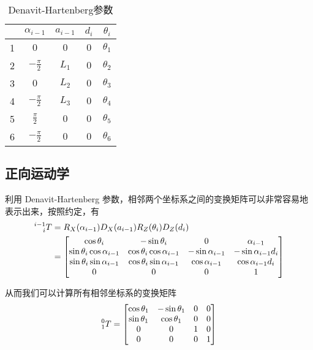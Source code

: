 \documentclass{ctexart}
\begin{document}
\begin{table}[ht]
    \caption{Denavit-Hartenberg参数}
    \label{tab:DH-params}
    \centering
    \begin{tabular}{c|cccc}
        \hline
        & $\alpha_{i-1}$ & $a_{i-1}$ & $d_i$ & $\theta_i$ \\
        \hline
        1 & $0$ & $0$ & $0$ & $\theta_1$ \\
        2 & $-\frac{\pi}{2}$ & $L_1$ & $0$ & $\theta_2$ \\
        3 & $0$ & $L_2$ & $0$ & $\theta_3$ \\
        4 & $-\frac{\pi}{2}$ & $L_3$ & $0$ & $\theta_4$\\
        5 & $\frac{\pi}{2}$ & $0$ & $0$ & $\theta_5$\\
        6 & $-\frac{\pi}{2}$ & $0$ & $0$ & $\theta_6$\\ \hline
    \end{tabular}
\end{table}

\subsection{正向运动学}

利用 Denavit-Hartenberg 参数，相邻两个坐标系之间的变换矩阵可以非常容易地表示出来，按照约定，有
\[ 
    \begin{aligned}
        \prescript{i-1}{i}{T} 
        &= R_X (\alpha_{i-1}) D_X (a_{i-1}) R_Z (\theta_i) D_Z (d_i) \\
        &= \begin{bmatrix}
            \cos \theta_i & - \sin \theta_i & 0 & \alpha_{i-1} \\
            \sin \theta_i \cos \alpha_{i-1} & \cos \theta_i \cos \alpha_{i-1} & - \sin \alpha_{i-1} & - \sin \alpha_{i-1} d_i \\
            \sin \theta_i \sin \alpha_{i-1} & \cos \theta_i \sin \alpha_{i-1} & \cos \alpha_{i-1} & \cos \alpha_{i-1} d_i \\
            0 & 0 & 0 & 1
        \end{bmatrix}
    \end{aligned}
\]

从而我们可以计算所有相邻坐标系的变换矩阵
\[
    \prescript{0}{1}{T} =
    \begin{bmatrix}
        \cos \theta_1 & - \sin \theta_1 & 0 & 0 \\
        \sin \theta_1 & \cos \theta_1 & 0 & 0 \\
        0 & 0 & 1 & 0 \\
        0 & 0 & 0 & 1
    \end{bmatrix}
\]
\end{document}
